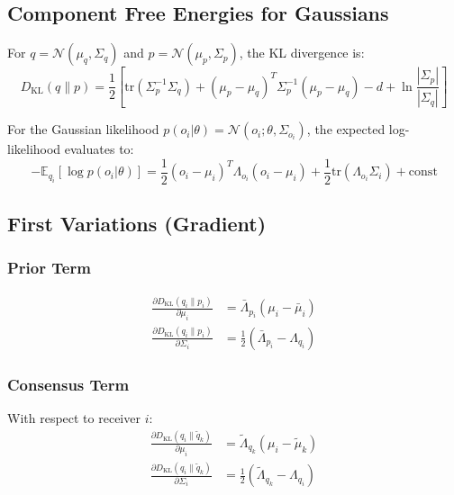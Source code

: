 \documentclass[11pt]{article}
\begin{document}
\subsection{Component Free Energies for Gaussians}

For $q = \mathcal{N}(\mu_q, \Sigma_q)$ and $p = \mathcal{N}(\mu_p, \Sigma_p)$, the KL divergence is:
\begin{equation}
D_{\mathrm{KL}}(q \| p) = \frac{1}{2}\left[\mathrm{tr}(\Sigma_p^{-1}\Sigma_q) + (\mu_p - \mu_q)^T \Sigma_p^{-1}(\mu_p - \mu_q) - d + \ln\frac{|\Sigma_p|}{|\Sigma_q|}\right]
\label{eq:kl_gaussian}
\end{equation}

For the Gaussian likelihood $p(o_i | \theta) = \mathcal{N}(o_i; \theta, \Sigma_{o_i})$, the expected log-likelihood evaluates to:
\begin{equation}
-\mathbb{E}_{q_i}[\log p(o_i | \theta)] = \frac{1}{2}(o_i - \mu_i)^T \Lambda_{o_i}(o_i - \mu_i) + \frac{1}{2}\mathrm{tr}(\Lambda_{o_i}\Sigma_i) + \mathrm{const}
\end{equation}

\subsection{First Variations (Gradient)}

\subsubsection{Prior Term}
\begin{align}
\frac{\partial D_{\mathrm{KL}}(q_i \| p_i)}{\partial \mu_i} &= \bar{\Lambda}_{p_i}(\mu_i - \bar{\mu}_i) \\
\frac{\partial D_{\mathrm{KL}}(q_i \| p_i)}{\partial \Sigma_i} &= \frac{1}{2}(\bar{\Lambda}_{p_i} - \Lambda_{q_i})
\end{align}

\subsubsection{Consensus Term}

With respect to receiver $i$:
\begin{align}
\frac{\partial D_{\mathrm{KL}}(q_i \| \tilde{q}_k)}{\partial \mu_i} &= \tilde{\Lambda}_{q_k}(\mu_i - \tilde{\mu}_k) \\
\frac{\partial D_{\mathrm{KL}}(q_i \| \tilde{q}_k)}{\partial \Sigma_i} &= \frac{1}{2}(\tilde{\Lambda}_{q_k} - \Lambda_{q_i})
\end{align}
\end{document}
